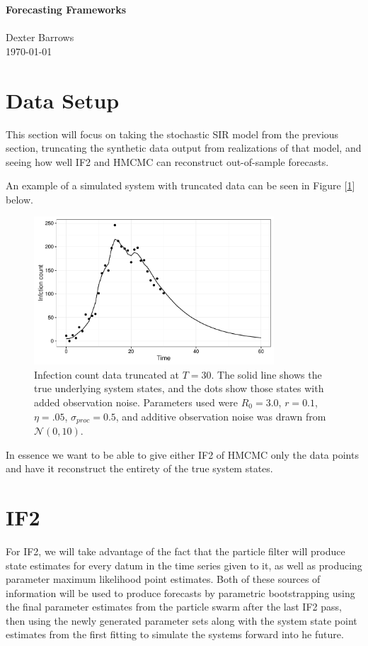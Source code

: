 \documentclass[12pt]{article}
\begin{document}
\noindent
{\LARGE {\bf Forecasting Frameworks} }
\\\\
Dexter Barrows\\
\today

\section{Data Setup}

	This section will focus on taking the stochastic SIR model from the previous section, truncating the synthetic data output from realizations of that model, and seeing how well IF2 and HMCMC can reconstruct out-of-sample forecasts.

	An example of a simulated system with truncated data can be seen in Figure [\ref{dataplot}] below.

	\begin{figure}[H]
        \centering
        \captionsetup{width=.8\linewidth}
        \includegraphics[width=0.8\textwidth]{./images/dataplot.pdf}
        \caption{Infection count data truncated at $T = 30$. The solid line shows the true underlying system states, and the dots show those states with added observation noise. Parameters used were $R_0 = 3.0$, $r = 0.1$, $\eta = .05$, $\sigma_{proc} = 0.5$, and additive observation noise was drawn from $\mathcal{N}(0,10)$.}
        \label{dataplot}
    \end{figure}

	In essence we want to be able to give either IF2 of HMCMC only the data points and have it reconstruct the entirety of the true system states.
    

\section{IF2}

	For IF2, we will take advantage of the fact that the particle filter will produce state estimates for every datum in the time series given to it, as well as producing parameter maximum likelihood point estimates. Both of these sources of information will be used to produce forecasts by parametric bootstrapping using the final parameter estimates from the particle swarm after the last IF2 pass, then using the newly generated parameter sets along with the system state point estimates from the first fitting to simulate the systems forward into he future.
\end{document}
